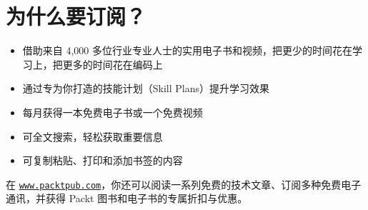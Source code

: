 \section{为什么要订阅？}
\begin{itemize}
  \item 借助来自 4,\allowbreak{}000 多位行业专业人士的实用电子书和视频，把更少的时间花在学习上，把更多的时间花在编码上
  \item 通过专为你打造的技能计划（Skill Plans）提升学习效果
  \item 每月获得一本免费电子书或一个免费视频
  \item 可全文搜索，轻松获取重要信息
  \item 可复制粘贴、打印和添加书签的内容
\end{itemize}
在 \href{www.packtpub.com}{\texttt{www.\allowbreak{}packtpub.\allowbreak{}com}}，你还可以阅读一系列免费的技术文章、订阅多种免费电子通讯，并获得 Packt 图书和电子书的专属折扣与优惠。
